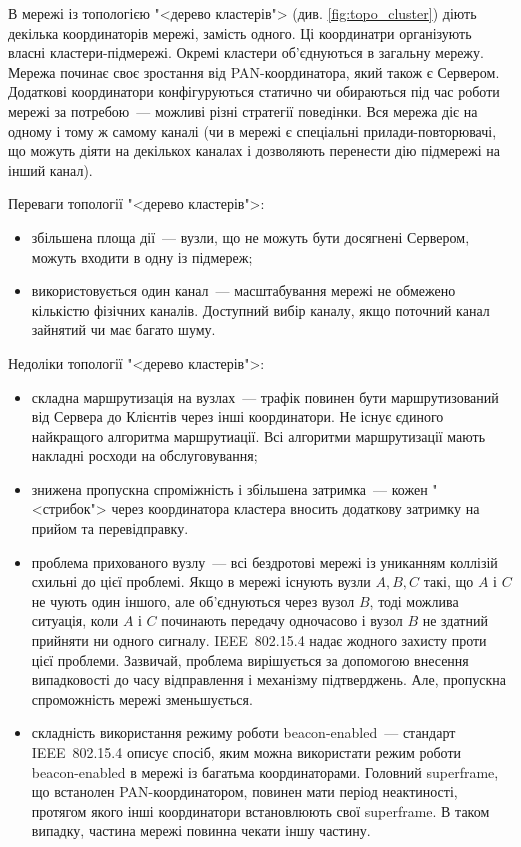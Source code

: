 \documentclass[a4paper,ukrainian,utf8,nocolumnsxix,floatsection,equationsection]{eskdtext}
\newcommand{\iee}[0]{IEEE~802.15.4\xspace}
\newcommand{\bem}[0]{beacon-enabled\xspace}
\begin{document}
В мережі із топологією "<дерево кластерів"> (див. \cref{fig:topo_cluster}) діють декілька координаторів мережі, замість одного. Ці координатри організують власні кластери-підмережі. Окремі кластери об’єднуються в загальну мережу. Мережа починає своє зростання від PAN-координатора, який також є Сервером. Додаткові координатори конфігуруються статично чи обираються під час роботи мережі за потребою~--- можливі різні стратегії поведінки. Вся мережа діє на одному і тому ж самому каналі (чи в мережі є спеціальні прилади-повторювачі, що можуть діяти на декількох каналах і дозволяють перенести дію підмережі на інший канал).

Переваги топології "<дерево кластерів">:
\begin{itemize}
	\item збільшена площа дії~--- вузли, що не можуть бути досягнені Сервером, можуть входити в одну із підмереж;
	\item використовується один канал~--- масштабування мережі не обмежено кількістю фізічних каналів. Доступний вибір каналу, якщо поточний канал зайнятий чи має багато шуму.
\end{itemize}

Недоліки топології "<дерево кластерів">:
\begin{itemize}
	\item складна маршрутизація на вузлах~--- трафік повинен бути маршрутизований від Сервера до Клієнтів через інші координатори. Не існує єдиного найкращого алгоритма маршрутиації. Всі алгоритми маршрутизації мають накладні росходи на обслуговування;
	\item знижена пропускна спроміжність і збільшена затримка~--- кожен "<стрибок"> через координатора кластера вносить додаткову затримку на прийом та перевідправку. 
	\item проблема прихованого вузлу~--- всі бездротові мережі із униканням коллізій схильні до цієї проблемі. Якщо в мережі існують вузли $A,B,C$ такі, що $A$ і $C$ не чують один іншого, але об’єднуються через вузол $B$, тоді можлива ситуація, коли $A$ і $C$ починають передачу одночасово і вузол $B$ не здатний прийняти ни одного сигналу. \iee надає жодного захисту проти цієї проблеми. Зазвичай, проблема вирішується за допомогою внесення випадковості до часу відправлення і механізму підтверджень. Але, пропускна спроможність мережі зменьшується.
	\item складність використання режиму роботи \bem~--- стандарт \iee описує спосіб, яким можна використати режим роботи \bem в мережі із багатьма координаторами. Головний superframe, що встанолен PAN-координатором, повинен мати період неактиності, протягом якого інші координатори встановлюють свої superframe. В таком випадку, частина мережі повинна чекати іншу частину.
\end{itemize}
\end{document}
